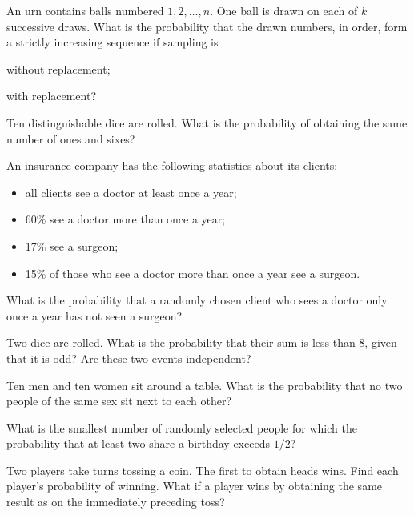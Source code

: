 \documentclass[a4paper]{report}
\begin{document}
\begin{problem}
An urn contains balls numbered $1,2,\dots,n$. One ball is drawn on each of $k$ successive draws. What is the probability that the drawn numbers, in order, form a strictly increasing sequence if sampling is
\begin{enumeratea}\item without replacement;\item with replacement?\end{enumeratea}
\end{problem}
\begin{problembook}Ten distinguishable dice are rolled. What is the probability of obtaining the same number of ones and sixes?\end{problembook}
\begin{problembook}
An insurance company has the following statistics about its clients:
\begin{itemize}
\item all clients see a doctor at least once a year;
\item 60\% see a doctor more than once a year;
\item 17\% see a surgeon;
\item 15\% of those who see a doctor more than once a year see a surgeon.
\end{itemize}
What is the probability that a randomly chosen client who sees a doctor only once a year has not seen a surgeon?
\end{problembook}
\begin{problembook}
Two dice are rolled. What is the probability that their sum is less than 8, given that it is odd? Are these two events independent?
\end{problembook}
\begin{problem}Ten men and ten women sit around a table. What is the probability that no two people of the same sex sit next to each other?\end{problem}
\begin{probleminteresting}
What is the smallest number of randomly selected people for which the probability that at least two share a birthday exceeds $1/2$?
\end{probleminteresting}
\begin{problembook}
Two players take turns tossing a coin. The first to obtain heads wins. Find each player's probability of winning. What if a player wins by obtaining the same result as on the immediately preceding toss?
\end{problembook}
\end{document}
